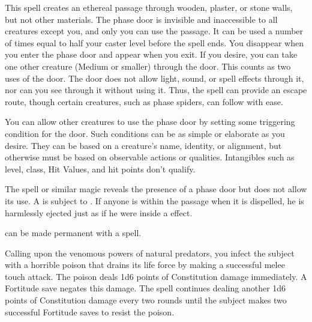 \begin{spelleffect}
  This spell creates an ethereal passage through wooden, plaster, or stone walls, but not other materials. The phase door is invisible and inaccessible to all creatures except you, and only you can use the passage. It can be used a number of times equal to half your caster level before the spell ends. You disappear when you enter the phase door and appear when you exit. If you desire, you can take one other creature (Medium or smaller) through the door. This counts as two uses of the door. The door does not allow light, sound, or spell effects through it, nor can you see through it without using it. Thus, the spell can provide an escape route, though certain creatures, such as phase spiders, can follow with ease.
  \par You can allow other creatures to use the phase door by setting some triggering condition for the door. Such conditions can be as simple or elaborate as you desire. They can be based on a creature's name, identity, or alignment, but otherwise must be based on observable actions or qualities. Intangibles such as level, class, Hit Values, and hit points don't qualify.
\end{spelleffect}
\begin{spellnotes}
  The  spell or similar magic reveals the presence of a phase door but does not allow its use. A  is subject to . If anyone is within the passage when it is dispelled, he is harmlessly ejected just as if he were inside a  effect.
  \par {} can be made permanent with a  spell.
\end{spellnotes}

\begin{spelleffect}
  Calling upon the venomous powers of natural predators, you infect the subject with a horrible poison that drains its life force by making a successful melee touch attack. The poison deals 1d6 points of Constitution damage immediately. A Fortitude save negates this damage. The spell continues dealing another 1d6 points of Constitution damage every two rounds until the subject makes two successful Fortitude saves to resist the poison.
\end{spelleffect}

